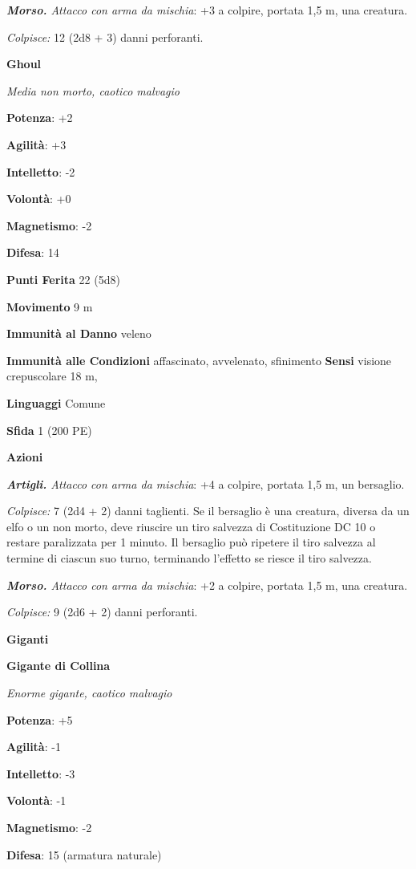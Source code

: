 \begin{multicols}{2}
\emph{\textbf{Morso.} Attacco con arma da mischia}: +3 a colpire,
portata 1,5 m, una creatura.

\emph{Colpisce:} 12 (2d8 + 3) danni perforanti.

\textbf{Ghoul}

\emph{Media non morto, caotico malvagio}

\textbf{Potenza}: +2

\textbf{Agilità}: +3

\textbf{Intelletto}: -2

\textbf{Volontà}: +0

\textbf{Magnetismo}: -2

\textbf{Difesa}: 14

\textbf{Punti Ferita} 22 (5d8)

\textbf{Movimento} 9 m

\textbf{Immunità al Danno} veleno

\textbf{Immunità alle Condizioni} affascinato, avvelenato, sfinimento
\textbf{Sensi} visione crepuscolare 18 m, 

\textbf{Linguaggi} Comune

\textbf{Sfida} 1 (200 PE)

\textbf{Azioni}

\emph{\textbf{Artigli.} Attacco con arma da mischia}: +4 a colpire,
portata 1,5 m, un bersaglio.

\emph{Colpisce:} 7 (2d4 + 2) danni taglienti. Se il bersaglio è una
creatura, diversa da un elfo o un non morto, deve riuscire un tiro
salvezza di Costituzione DC 10 o restare paralizzata per 1 minuto. Il
bersaglio può ripetere il tiro salvezza al termine di ciascun suo turno,
terminando l'effetto se riesce il tiro salvezza.

\emph{\textbf{Morso.} Attacco con arma da mischia}: +2 a colpire,
portata 1,5 m, una creatura.

\emph{Colpisce:} 9 (2d6 + 2) danni perforanti.



\textbf{Giganti}

\textbf{Gigante di Collina}

\emph{Enorme gigante, caotico malvagio}

\textbf{Potenza}: +5

\textbf{Agilità}: -1

\textbf{Intelletto}: -3

\textbf{Volontà}: -1

\textbf{Magnetismo}: -2

\textbf{Difesa}: 15 (armatura naturale)


\end{multicols}
